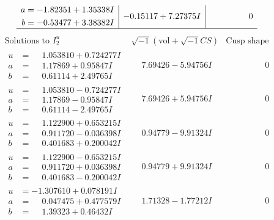 \documentclass[1p]{elsarticle_modified}
\theoremstyle{definition}
\newcommand{\I}{\sqrt{-1}}
\begin{document}
$$\begin{array}{c|c|c}
\begin{aligned}
a &= -1.82351 + 1.35338 I \\
b &= -0.53477 + 3.38382 I\end{aligned}
 & -0.15117 + 7.27375 I & \phantom{-0.000000 } 0\\
 \hline 
 \end{array}$$\newpage$$\begin{array}{c|c|c}  
\text{Solutions to }I^u_{2}& \I (\text{vol} + \sqrt{-1}CS) & \text{Cusp shape}\\
 \hline 
\begin{aligned}
u &= \phantom{-}1.053810 + 0.724277 I \\
a &= \phantom{-}1.17869 + 0.95847 I \\
b &= \phantom{-}0.61114 + 2.49765 I\end{aligned}
 & \phantom{-}7.69426 - 5.94756 I & \phantom{-0.000000 } 0 \\ \hline\begin{aligned}
u &= \phantom{-}1.053810 - 0.724277 I \\
a &= \phantom{-}1.17869 - 0.95847 I \\
b &= \phantom{-}0.61114 - 2.49765 I\end{aligned}
 & \phantom{-}7.69426 + 5.94756 I & \phantom{-0.000000 } 0 \\ \hline\begin{aligned}
u &= \phantom{-}1.122900 + 0.653215 I \\
a &= \phantom{-}0.911720 - 0.036398 I \\
b &= \phantom{-}0.401683 + 0.200042 I\end{aligned}
 & \phantom{-}0.94779 - 9.91324 I & \phantom{-0.000000 } 0 \\ \hline\begin{aligned}
u &= \phantom{-}1.122900 - 0.653215 I \\
a &= \phantom{-}0.911720 + 0.036398 I \\
b &= \phantom{-}0.401683 - 0.200042 I\end{aligned}
 & \phantom{-}0.94779 + 9.91324 I & \phantom{-0.000000 } 0 \\ \hline\begin{aligned}
u &= -1.307610 + 0.078191 I \\
a &= \phantom{-}0.047475 + 0.477579 I \\
b &= \phantom{-}1.39323 + 0.46432 I\end{aligned}
 & \phantom{-}1.71328 - 1.77212 I & \phantom{-0.000000 } 0 \\ \hline\begin{aligned}

\end{aligned}
\end{array}$$
\end{document}
